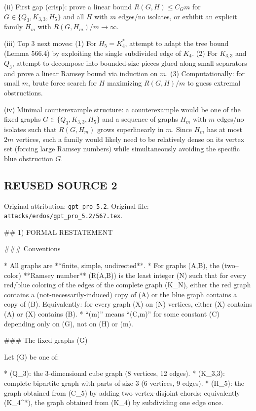 (ii) First gap (crisp): prove a linear bound $R(G,H)\le C_G m$ for $G\in\{Q_3,K_{3,3},H_5\}$ and all $H$ with $m$ edges/no isolates, or exhibit an explicit family $H_m$ with $R(G,H_m)/m\to\infty$.

(iii) Top 3 next moves:
(1) For $H_5=K_4^*$, attempt to adapt the tree bound (Lemma 566.4) by exploiting the single subdivided edge of $K_4$.
(2) For $K_{3,3}$ and $Q_3$, attempt to decompose into bounded-size pieces glued along small separators and prove a linear Ramsey bound via induction on $m$.
(3) Computationally: for small $m$, brute force search for $H$ maximizing $R(G,H)/m$ to guess extremal obstructions.

(iv) Minimal counterexample structure: a counterexample would be one of the fixed graphs $G\in\{Q_3,K_{3,3},H_5\}$ and a sequence of graphs $H_m$ with $m$ edges/no isolates such that $R(G,H_m)$ grows superlinearly in $m$.
Since $H_m$ has at most $2m$ vertices, such a family would likely need to be relatively dense on its vertex set (forcing large Ramsey numbers) while simultaneously avoiding the specific blue obstruction $G$.


\subsection*{REUSED SOURCE 2}
Original attribution: \texttt{gpt\_pro\_5.2}.
Original file: \texttt{attacks/erdos/gpt\_pro\_5.2/567.tex}.

## 1) FORMAL RESTATEMENT

### Conventions

* All graphs are **finite, simple, undirected**.
* For graphs (A,B), the (two–color) **Ramsey number** (R(A,B)) is the least integer (N) such that for every red/blue coloring of the edges of the complete graph (K_N), either the red graph contains a (not-necessarily-induced) copy of (A) or the blue graph contains a copy of (B). Equivalently: for every graph (X) on (N) vertices, either (X) contains (A) or (\overline X) contains (B).
* “(\ll m)” means “(\le C,m)” for some constant (C) depending only on (G), not on (H) or (m).

### The fixed graphs (G)

Let (G) be one of:

* (Q_3): the 3-dimensional cube graph (8 vertices, 12 edges).
* (K_{3,3}): complete bipartite graph with parts of size 3 (6 vertices, 9 edges).
* (H_5): the graph obtained from (C_5) by adding two vertex-disjoint chords; equivalently (K_4^*), the graph obtained from (K_4) by subdividing one edge once.


